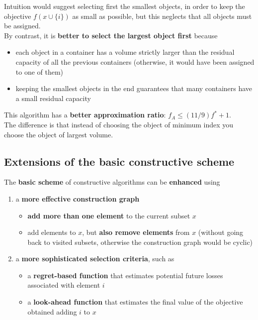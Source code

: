 \documentclass[11pt]{article}
\begin{document}
	Intuition would suggest selecting first the smallest objects, in order to keep the objective $f (x \cup \{i\})$ as small as possible, but this neglects that all objects must be assigned.\\
	
	By contrast, it is \textbf{better to select the largest object first} because
	\begin{itemize}
		\item each object in a container has a volume strictly larger than the residual capacity of all the previous containers (otherwise, it would have been assigned to one of them)
		\item keeping the smallest objects in the end guarantees that many containers have a small residual capacity
	\end{itemize}
	This algorithm has a \textbf{better approximation ratio}: $f_A \leq (11/9) f^\ast + 1$.\\
	
	The difference is that instead of choosing the object of minimum index you choose the object of largest volume.\\
	
	
	\newpage
	
	\subsection{Extensions of the basic constructive scheme}
	The \textbf{basic scheme} of constructive algorithms can be \textbf{enhanced} using
	\begin{enumerate}
		\item a \textbf{more effective construction graph}
		\begin{itemize}
			\item \textbf{add more than one element} to the current subset $x$
			\item add elements to $x$, but \textbf{also remove elements} from $x$ (without going back to visited subsets, otherwise the construction graph would be cyclic)
		\end{itemize}
		\nn
		
		\item a \textbf{more sophisticated selection criteria}, such as
		\begin{itemize}
			\item a \textbf{regret-based function} that estimates potential future losses associated with element $i$
			\item a \textbf{look-ahead function} that estimates the final value of the objective obtained adding $i$ to $x$
		\end{itemize}
	\end{enumerate}
	
\end{document}
